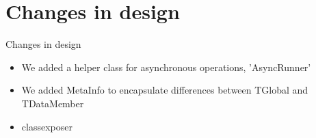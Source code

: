 \section{Changes in design}

\begin{frame}{Changes in design}
	\begin{itemize}
		\item We added a helper class for asynchronous operations, 'AsyncRunner'
		\item We added MetaInfo to encapsulate differences between TGlobal and TDataMember
		\item classexposer
	\end{itemize}
\end{frame}
